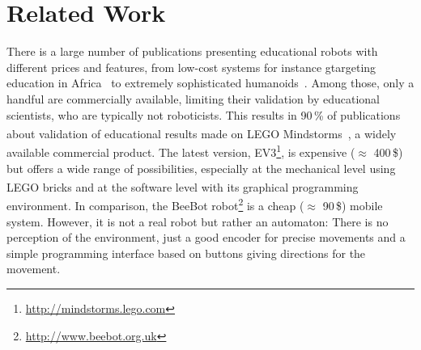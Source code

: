 \documentclass[letterpaper, 10 pt, conference]{ieeeconf}  %
\begin{document}
\section{Related Work}

There is a large number of publications presenting educational robots with different prices and features, from low-cost systems for instance gtargeting education in Africa~\cite{Rubenstein2015,Gyebi2015} to extremely sophisticated humanoids~\cite{Hood2015,Mazzoni2016}.
Among those, only a handful are commercially available, limiting their validation by educational scientists, who are typically not roboticists.
This results in 90\,\% of publications about validation of educational results made on LEGO\textsuperscript{\textregistered} Mindstorms\textsuperscript{\textregistered}~\cite{benitti2012exploring}, a widely available commercial product.
The latest version, EV3\footnote{\url{http://mindstorms.lego.com}}, is expensive ($\approx$ 400\,\$) but offers a wide range of possibilities, especially at the mechanical level using LEGO\textsuperscript{\textregistered} bricks and at the software level with its graphical programming environment. 
In comparison, the BeeBot robot\footnote{\url{http://www.beebot.org.uk}} is a cheap ($\approx$ 90\,\$) mobile system.
However, it is not a real robot but rather an automaton: There is no perception of the environment, just a good encoder for precise movements and a simple programming interface based on buttons giving directions for the movement.
\end{document}
